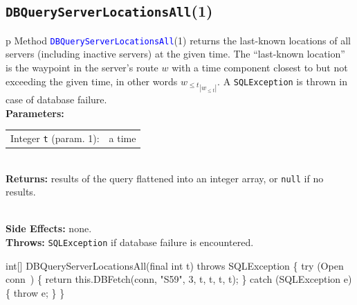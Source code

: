 \subsection{\texttt{DBQueryServerLocationsAll}(1)}
\begin{tabular}{p{\textwidth}}
\toprule
{}
Method \textcolor{blue}{{\tt{}\protect{}DBQueryServerLocationsAll}}(1) returns the
last-known locations of all servers (including inactive servers) at the given
time. The ``last-known location'' is the waypoint in the server's route $w$
with a time component closest to but not exceeding the given time, in other
words ${w_{\leq t}}_{|w_{\leq t}|}$.
A {\tt{}SQLException} is thrown in case of database failure.\\
\midrule
\textbf{Parameters:} \\
\begin{tabular}{lp{116mm}}
Integer {\tt{}t} (param. 1):&a time
\end{tabular}\\
\textbf{Returns:} results of the query flattened into an integer array, or
{\tt{}null} if no results.

\\
\textbf{Side Effects:} none.\\
\textbf{Throws:} {\tt{}SQLException} if database failure is encountered.\\
\bottomrule
\end{tabular}
\nwenddocs{}\endmoddef{}
int[] DBQueryServerLocationsAll(final int t) throws SQLException \{
  try (\LA{}Open \code{}conn\edoc{}~{\nwtagstyle{}}\RA{}) \{
    return this.DBFetch(conn, "S59", 3, t, t, t, t);
  \} catch (SQLException e) \{
    throw e;
  \}
\}
\eatline
{}\nwendcode{}\nwdocspar
